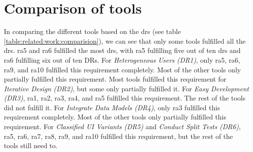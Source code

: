 \clearpage
\section{Comparison of tools}
\label{section:related-word:comparison}
In comparing the different tools based on the \ac{dr}s (see table \ref{table:related:work:comparision}), we can see that only some tools fulfilled all the \ac{dr}s. 
\ac{ra}5 and \ac{ra}6 fulfilled the most \ac{dr}s, with \ac{ra}5 fulfilling five out of ten \ac{dr}s and \ac{ra}6 fulfilling six out of ten DRs.
For \textit{Heterogeneous Users (DR1)}, only \ac{ra}5, \ac{ra}6, \ac{ra}9, and \ac{ra}10 fulfilled this requirement completely. Most of the other tools only partially fulfilled this requirement.
Most tools fulfilled this requirement for \textit{Iterative Design (DR2)}, but some only partially fulfilled it.
For \textit{Easy Development (DR3)}, \ac{ra}1, \ac{ra}2, \ac{ra}3, \ac{ra}4, and \ac{ra}5 fulfilled this requirement. 
The rest of the tools did not fulfill it.
For \textit{Integrate Data Models (DR4)}, only \ac{ra}3 fulfilled this requirement completely. 
Most of the other tools only partially fulfilled this requirement.
For \textit{Classified UI Variants (DR5)} and \textit{Conduct Split Tests (DR6)}, \ac{ra}5, \ac{ra}6, \ac{ra}7, \ac{ra}8, \ac{ra}9, and \ac{ra}10 fulfilled this requirement, but the rest of the tools still need to.

